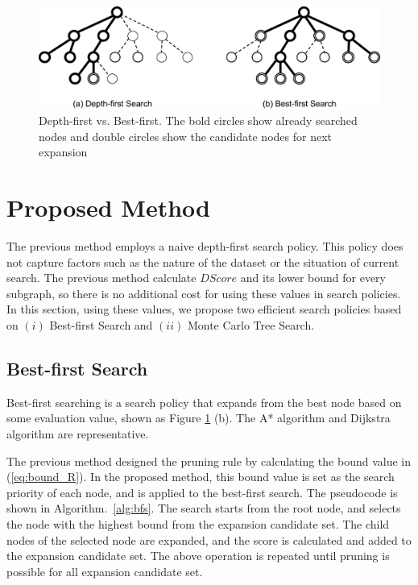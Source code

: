 \begin{figure}[t]
  	\centering
  	\includegraphics[width=0.9\linewidth]{img/search.eps}
	\caption{
		Depth-first vs. Best-first.
		The bold circles show already searched nodes and 
		double circles show the candidate nodes for next expansion}
  	\label{fig:search}
\end{figure}

\section{Proposed Method}
The previous method \cite{Shirakawa:2018} employs a naive depth-first search policy. 
This policy does not capture factors such as the nature of the dataset or the situation of current search.
The previous method calculate $DScore$ and its lower bound for every subgraph, 
so there is no additional cost for using these values in search policies.
In this section, using these values, 
we propose two efficient search policies 
based on $(i)$ Best-first Search and $(ii)$ Monte Carlo Tree Search.

\subsection{Best-first Search}
Best-first searching \cite{pearl:1984} is a search policy 
that expands from the best node based on some evaluation value, shown as Figure \ref{fig:search} (b).
The A* algorithm \cite{hart:1968} and Dijkstra algorithm \cite{dijkstra:1959} are representative.

The previous method designed the pruning rule 
by calculating the bound value in (\ref{eq:bound_R}). 
In the proposed method, this bound value is set as the search priority of each node, 
and is applied to the best-first search.
The pseudocode is shown in Algorithm.~\ref{alg:bfs}.
The search starts from the root node, 
and selects the node with the highest bound from the expansion candidate set.
The child nodes of the selected node are expanded, 
and the score is calculated and added to the expansion candidate set.
The above operation is repeated until pruning is possible for all expansion candidate set.\\

